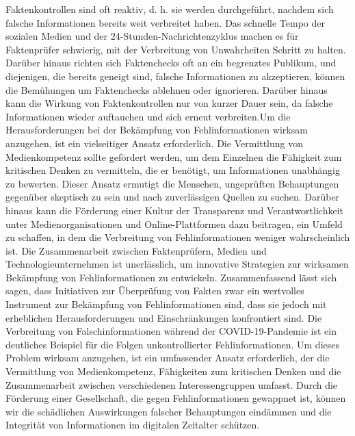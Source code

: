 \documentclass[a4paper,listof=totoc,bibliography=totoc]{scrartcl}
\begin{document}
Faktenkontrollen sind oft reaktiv, d. h. sie werden durchgeführt, nachdem sich falsche Informationen bereits weit verbreitet haben. Das schnelle Tempo der 
sozialen Medien und der 24-Stunden-Nachrichtenzyklus machen es für Faktenprüfer schwierig, mit der Verbreitung von Unwahrheiten Schritt zu halten. Darüber 
hinaus richten sich Faktenchecks oft an ein begrenztes Publikum, und diejenigen, die bereits geneigt sind, falsche Informationen zu akzeptieren, können die 
Bemühungen um Faktenchecks ablehnen oder ignorieren. Darüber hinaus kann die Wirkung von Faktenkontrollen nur von kurzer Dauer sein, da falsche Informationen 
wieder auftauchen und sich erneut verbreiten.Um die Herausforderungen bei der Bekämpfung von Fehlinformationen wirksam anzugehen, ist ein vielseitiger Ansatz 
erforderlich. Die Vermittlung von Medienkompetenz sollte gefördert werden, um dem Einzelnen die Fähigkeit zum kritischen Denken zu vermitteln, die er benötigt, 
um Informationen unabhängig zu bewerten. Dieser Ansatz ermutigt die Menschen, ungeprüften Behauptungen gegenüber skeptisch zu sein und nach zuverlässigen Quellen 
zu suchen. Darüber hinaus kann die Förderung einer Kultur der Transparenz und Verantwortlichkeit unter Medienorganisationen und Online-Plattformen dazu beitragen, 
ein Umfeld zu schaffen, in dem die Verbreitung von Fehlinformationen weniger wahrscheinlich ist. Die Zusammenarbeit zwischen Faktenprüfern, Medien und Technologieunternehmen 
ist unerlässlich, um innovative Strategien zur wirksamen Bekämpfung von Fehlinformationen zu entwickeln. Zusammenfassend lässt sich sagen, dass Initiativen zur Überprüfung von 
Fakten zwar ein wertvolles Instrument zur Bekämpfung von Fehlinformationen sind, dass sie jedoch mit erheblichen Herausforderungen und Einschränkungen konfrontiert sind. 
Die Verbreitung von Falschinformationen während der COVID-19-Pandemie ist ein deutliches Beispiel für die Folgen unkontrollierter Fehlinformationen. Um dieses Problem 
wirksam anzugehen, ist ein umfassender Ansatz erforderlich, der die Vermittlung von Medienkompetenz, Fähigkeiten zum kritischen Denken und die Zusammenarbeit zwischen 
verschiedenen Interessengruppen umfasst. Durch die Förderung einer Gesellschaft, die gegen Fehlinformationen gewappnet ist, können wir die schädlichen Auswirkungen falscher 
Behauptungen eindämmen und die Integrität von Informationen im digitalen Zeitalter schützen.
\end{document}
